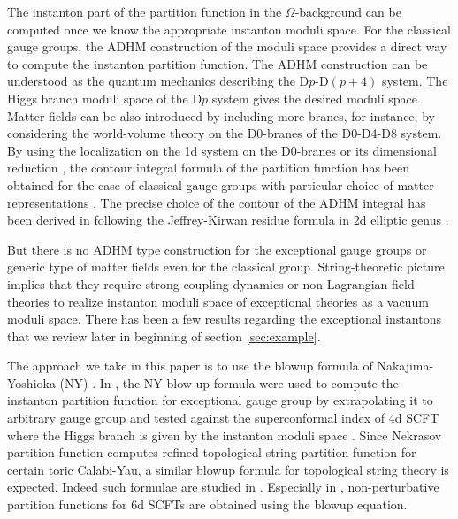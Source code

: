 \documentclass[letterpaper, 11pt]{article}
\begin{document}
The instanton part of the partition function in the $\Omega$-background can be computed once we know the appropriate instanton moduli space. For the classical gauge groups, the ADHM construction of the moduli space \cite{Atiyah:1978ri} provides a direct way to compute the instanton partition function. The ADHM construction can be understood as the quantum mechanics describing the D$p$-D$(p+4)$ system. The Higgs branch moduli space of the D$p$ system gives the desired moduli space. Matter fields can be also introduced by including more branes, for instance,
by considering the world-volume theory on the D0-branes of the D0-D4-D8 system. 
By using the localization on the 1d system on the D0-branes or its dimensional reduction \cite{Moore:1997dj, Bruzzo:2002xf}, the contour integral formula of the partition function has been obtained for the case of classical gauge groups with particular choice of matter representations \cite{Nekrasov:2004vw, Marino:2004cn, Fucito:2004gi, Hollands:2010xa, Hollands:2011zc}. 
The precise choice of the contour of the ADHM integral has been derived in \cite{Hwang:2014uwa, Cordova:2014oxa,Hori:2014tda} following the Jeffrey-Kirwan residue formula in 2d elliptic genus \cite{Benini:2013xpa,Benini:2013nda}. 

But there is no ADHM type construction for the exceptional gauge groups or generic type of matter fields even for the classical group. String-theoretic picture implies that they require strong-coupling dynamics or non-Lagrangian field theories to realize instanton moduli space of exceptional theories as a vacuum moduli space. There has been a few results regarding the exceptional instantons that we review later in beginning of section \ref{sec:example}. 

The approach we take in this paper is to use the blowup formula of Nakajima-Yoshioka (NY) \cite{Nakajima:2003pg,Nakajima:2003uh,Nakajima:2005fg, Gottsche:2006bm, Nakajima:2009qjc, Gottsche:2010ig}. In \cite{Keller:2012da}, the NY blow-up formula were used to compute the instanton partition function for exceptional gauge group by extrapolating it to arbitrary gauge group and tested against the superconformal index of 4d SCFT where the Higgs branch is given by the instanton moduli space \cite{Gaiotto:2012uq}. Since Nekrasov partition function computes refined topological string partition function for certain toric Calabi-Yau, a similar blowup formula for topological string theory is expected. Indeed such formulae are studied in \cite{Grassi:2016nnt, Gu:2017ccq, Huang:2017mis, Gu:2018gmy,Gu:2019dan}. Especially in \cite{Gu:2018gmy,Gu:2019dan}, non-perturbative partition functions for 6d SCFTs are obtained using the blowup equation. 
\end{document}
